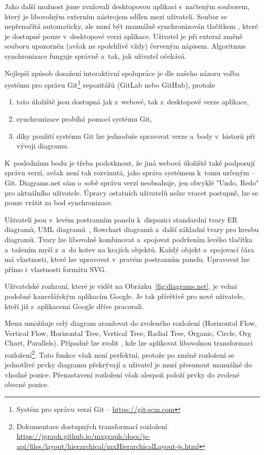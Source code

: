 Jako další možnost jsme zvažovali desktopovou aplikaci s~načteným souborem, který je libovolným externím nástrojem sdílen mezi uživateli.
Soubor se nepřenačítá automaticky, ale musí být manuálně synchronizován tlačítkem , které je dostupné pouze v~desktopové verzi aplikace.
Uživatel je při externí změně souboru upozorněn (avšak ne spolehlivě vždy) červeným nápisem.
Algoritmus synchronizace funguje správně a~tak, jak uživatel očekává.

Nejlepší způsob dosažení interaktivní spolupráce je dle našeho názoru volba systému pro správu Git\footnote{Systém pro správu verzí Git -- \url{https://git-scm.com}} repozitářů (GitLab nebo GitHub), protože
\begin{enumerate}
  \item tato úložiště jsou dostupná jak z~webové, tak z~desktopové verze aplikace,
  \item synchronizace probíhá pomocí systému Git,
  \item díky použití systému Git lze jednoduše spravovat verze a~body v~historii při vývoji diagramu.
\end{enumerate}

K~poslednímu bodu je třeba podotknout, že jiná webová úložiště také podporují správu verzí, avšak není tak rozvinutá, jako správa systémem k~tomu určeným -- Git.
Diagrams.net sám o~sobě správu verzí neobsahuje, jen obvyklé "Undo, Redo" pro aktuálního uživatele.
Úpravy ostatních uživatelů nelze vracet postupně, lze se pouze vrátit za bod synchronizace.

Uživateli jsou v~levém postranním panelu k~dispozici standardní tvary ER diagramů, UML diagramů~\cite{omg_uml_2017}, flowchart diagramů a~další základní tvary pro kresbu diagramů.
Tvary lze libovolně kombinovat a~spojovat podržením levého tlačítka a~tažením myší z~a~do kotev na krajích objektů.
Každý objekt a~spojovací čára má vlastnosti, které lze upravovat v~pravém postranním panelu.
Upravovat lze přímo i~vlastnosti formátu SVG.

Uživatelské rozhraní, které je vidět na Obrázku~\ref{fig:diagrams.net}, je velmi podobné kancelářským aplikacím Google.
Je tak přívětivé pro nové uživatele, kteří již s~aplikacemi Google dříve pracovali.

Menu  umožňuje celý diagram aranžovat do zvoleného rozložení (Horizontal Flow, Vertical Flow, Horizontal Tree, Vertical Tree, Radial Tree, Organic, Circle, Org Chart, Parallels).
Případně lze zvolit , kde lze aplikovat libovolnou transformaci rozložení\footnote{Dokumentace dostupných transformací rozložení \url{https://jgraph.github.io/mxgraph/docs/js-api/files/layout/hierarchical/mxHierarchicalLayout-js.html}}.
Tato funkce však není perfektní, protože po změně rozložení se jednotlivé prvky diagramu překrývají a uživatel je musí přesunout manuálně do vhodné pozice.
Přenastavení rozložení však alespoň položí prvky do zvolené obecné pozice.

